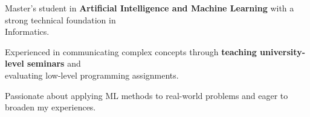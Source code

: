
\par{ Master’s student in \textbf{Artificial Intelligence and Machine Learning} with a strong technical foundation in \\Informatics.

Experienced in communicating complex concepts through \textbf{teaching university-level seminars} and \\evaluating low-level programming assignments. 

Passionate about applying ML methods to real-world problems and eager to broaden my experiences. }
